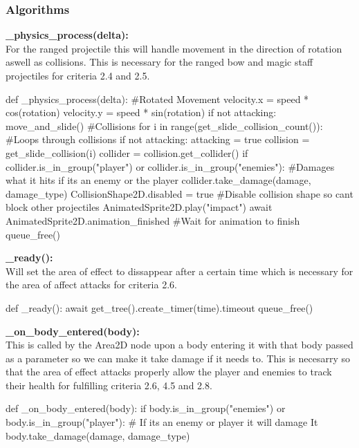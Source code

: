 \documentclass{article}
\begin{document}
        \subsubsection{Algorithms}
        \textbf{\_physics\_process(delta):}\\
        For the ranged projectile this will handle movement in the direction of rotation aswell as collisions. This is necessary for the ranged bow and magic staff projectiles for criteria 2.4 and 2.5.\\
        \begin{python}
def _physics_process(delta):
   #Rotated Movement
   velocity.x = speed * cos(rotation)
   velocity.y = speed * sin(rotation)
   if not attacking:
      move_and_slide()
   #Collisions
   for i in range(get_slide_collision_count()): #Loops through collisions
      if not attacking:
         attacking = true
         collision = get_slide_collision(i)
         collider = collision.get_collider()
         if collider.is_in_group("player") or collider.is_in_group("enemies"): #Damages what it hits if its an enemy or the player
            collider.take_damage(damage, damage_type) 
         CollisionShape2D.disabled = true #Disable collision shape so cant block other projectiles
         AnimatedSprite2D.play("impact")
         await AnimatedSprite2D.animation_finished #Wait for animation to finish
         queue_free()
        \end{python}
        \textbf{\_ready():}\\
        Will set the area of effect to dissappear after a certain time which is necessary for the area of affect attacks for criteria 2.6.
        \begin{python}
def _ready():
   await get_tree().create_timer(time).timeout
   queue_free()
        \end{python}
        \textbf{\_on\_body\_entered(body):}\\
        This is called by the Area2D node upon a body entering it with that body passed as a parameter so we can make it take damage if it needs to. This is necesarry so that the area of effect attacks properly allow the player and enemies to track their health for fulfilling criteria 2.6, 4.5 and 2.8.\\
        \begin{python}
def _on_body_entered(body):
   if body.is_in_group("enemies") or body.is_in_group("player"): # If its an enemy or player it will damage It
      body.take_damage(damage, damage_type)
        \end{python}
\end{document}
